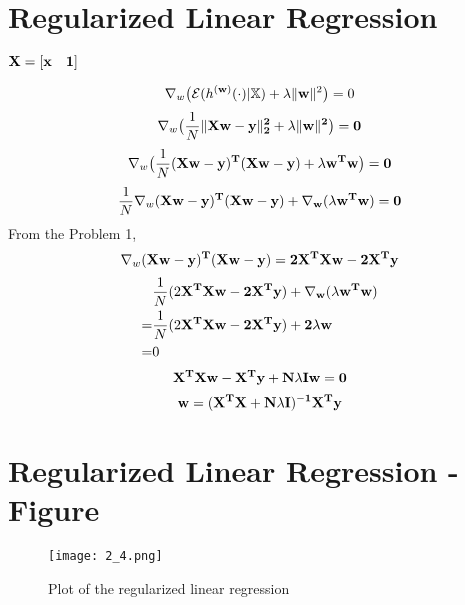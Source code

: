 \documentclass[article,11pt]{article}
\begin{document}
\section{Regularized Linear Regression}
\begin{center}
	$\bf{X}=\left[ {\bf x} \quad 1\right] $\\
\end{center}
\begin{equation}
\nabla_{w}\big(  \mathcal{E}(h^{(\mathbf{w})}(\cdot) | \mathbb{X})+ \lambda \| {\bf w} \|^{2} \big)=0
\end{equation}
\begin{equation}
	\nabla_{w}\big(  \frac{1}{N}\lVert \bf{X} {\bf w}-{\bf y} \rVert_{2}^{2}+ \lambda \| {\bf w} \|^{2} \big)=0
\end{equation}
\begin{equation}
\nabla_{w}\big(  \frac{1}{N}(\bf{X}{\bf w}-{\bf y})^{T}(\bf{X}{\bf w}-{\bf y})+ \lambda {\bf w}^{T}{\bf w} \big)=0
\end{equation}
\begin{equation}
	\frac{1}{N}\nabla_{w}(\bf{X}{\bf w}-{\bf y})^{T}(\bf{X}{\bf w}-{\bf y})+\nabla_{w}(\lambda {\bf w}^{T}{\bf w}) = 0
\end{equation}
From the Problem 1, 
\begin{equation}
	\nabla_{w}(\bf{X}{\bf w}-{\bf y})^{T}(\bf{X}{\bf w}-{\bf y})=2\bf{X}^{T}\bf{X}{\bf w}-2\bf{X}^{T}{\bf y}
\end{equation}
\begin{equation}
\begin{aligned}
& \frac{1}{N}(2\bf{X}^{T}\bf{X}{\bf w}-2\bf{X}^{T}{\bf y})+\nabla_{w}(\lambda {\bf w}^{T}{\bf w})\\ 
=& \frac{1}{N}(2\bf{X}^{T}\bf{X}{\bf w}-2\bf{X}^{T}{\bf y}) + 2\lambda {\bf w} \\ =& 0
\end{aligned}	
\end{equation}
\begin{equation}
	\bf{X}^{T}\bf{X} {\bf w}-\bf{X}^{T}{\bf y}+\bm{N}\lambda \bm{I}{\bf w} = 0
\end{equation}
\begin{equation}
	{\bf w}=(\bf{X}^{T}\bf{X}+\bm{N}\lambda \bm{I})^{-1}\bf{X}^{T}{\bf y}
\end{equation}
\newpage
\section{Regularized Linear Regression - Figure}
\begin{figure}[H]
	\centering
	\captionsetup{justification=centering}
	\texttt{[image: 2\_4.png]}
	\caption{Plot of the regularized linear regression}
\end{figure}
\end{document}
